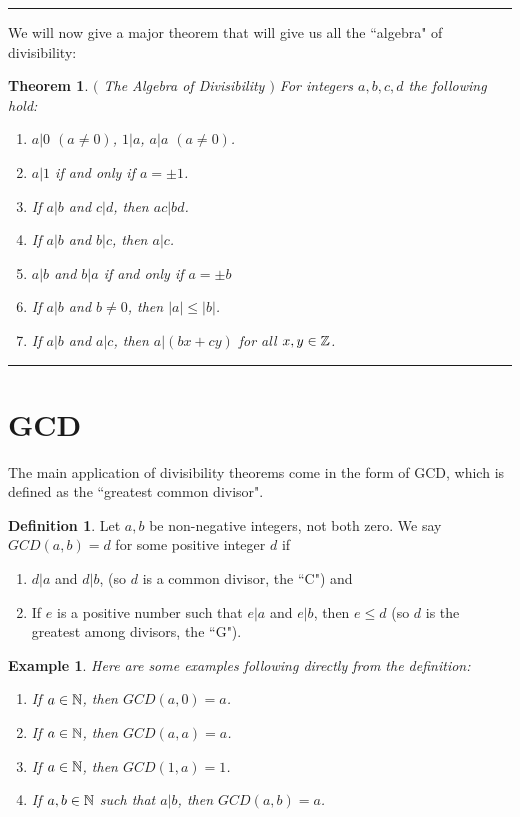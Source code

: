 \documentclass[12pt]{article}
\theoremstyle{plain}
\newtheorem{example}{Example}
\newtheorem{theorem}{Theorem}
\theoremstyle{definition}
\newtheorem{definition}{Definition}
\theoremstyle{remark}
\begin{document}
\bigskip
\hrule

\bigskip
\noindent
We will now give a major theorem that will give us all the ``algebra" of divisibility:

\begin{theorem} $($ The Algebra of Divisibility $)$
For integers $a, b, c, d$ the following hold:
\begin{enumerate}
    \item $a|0$ $(a\neq 0)$, $1|a$, $a|a$ $(a\neq 0)$.
    \item $a|1$ if and only if $a=\pm 1$.
    \item If $a|b$ and $c|d$, then $ac|bd$.
    \item If $a|b$ and $b|c$, then $a|c$.
    \item $a|b$ and $b|a$ if and only if $a=\pm b$
    \item If $a|b$ and $b\neq 0$, then $|a|\leq |b|$.
    \item If $a|b$ and $a|c$, then $a|(bx+cy)$ for all $x,y\in \mathbb{Z}$.
\end{enumerate}
\end{theorem}

\bigskip
\hrule

\section{GCD}

The main application of divisibility theorems come in the form of GCD, which is defined as the ``greatest common divisor".
\begin{definition}
Let $a, b$ be non-negative integers, not both zero. We say $GCD(a,b)=d$ for some positive integer $d$ if
\begin{enumerate}
    \item $d|a$ and $d|b$, (so $d$ is a common divisor, the ``C") and
    \item If $e$ is a positive number such that $e|a$ and $e|b$, then $e\leq d$ (so $d$ is the greatest among divisors, the ``G").
\end{enumerate}
\end{definition}

\begin{example} Here are some examples following directly from the definition:
\begin{enumerate}
    \item If $a\in \mathbb{N}$, then $GCD(a,0)=a$.
    \item If $a\in \mathbb{N}$, then $GCD(a,a)=a$.
    \item If $a\in \mathbb{N}$, then $GCD(1,a) =1$.
    \item If $a,b \in \mathbb{N}$ such that $a|b$, then $GCD(a,b)=a$.
\end{enumerate}
\end{example}
\end{document}

